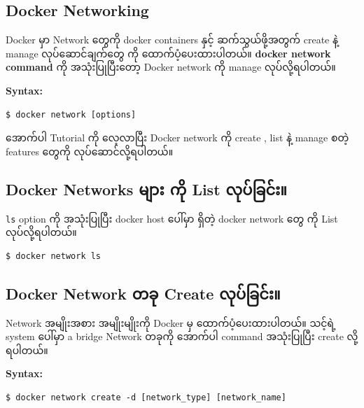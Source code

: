 \hypertarget{docker-networking-1}{%
\subsection{Docker Networking}\label{docker-networking-1}}

Docker မှာ Network တွေကို docker containers နှင့် ဆက်သွယ်ဖို့အတွက်
create နဲ့ manage လုပ်ဆောင်ချက်တွေ ကို ထောက်ပံ့ပေးထားပါတယ်။
\textbf{docker network command} ကို အသုံးပြုပြီးတော့ Docker network ကို
manage လုပ်လို့ရပါတယ်။

\textbf{Syntax:}

\begin{verbatim}
$ docker network [options]
\end{verbatim}

အောက်ပါ Tutorial ကို လေ့လာပြီး Docker network ကို create , list နဲ့
manage စတဲ့ features တွေကို လုပ်ဆောင်လို့ရပါတယ်။

\hypertarget{docker-networks-ux1019ux103bux102cux1038-ux1000ux102dux102f-list-ux101cux102fux1015ux103aux1001ux103cux1004ux103aux1038}{%
\subsection{Docker Networks များ ကို List
လုပ်ခြင်း။}\label{docker-networks-ux1019ux103bux102cux1038-ux1000ux102dux102f-list-ux101cux102fux1015ux103aux1001ux103cux1004ux103aux1038}}

\texttt{ls} option ကို အသုံးပြုပြီး docker host ပေါ်မှာ ရှိတဲ့ docker
network တွေ ကို List လုပ်လို့ရပါတယ်။

\begin{verbatim}
$ docker network ls
\end{verbatim}

\hypertarget{docker-network-ux1010ux1001ux102f-create-ux101cux102fux1015ux103aux1001ux103cux1004ux103aux1038}{%
\subsection{Docker Network တခု Create
လုပ်ခြင်း။}\label{docker-network-ux1010ux1001ux102f-create-ux101cux102fux1015ux103aux1001ux103cux1004ux103aux1038}}

Network အမျိုးအစား အမျိုးမျိုးကို Docker မှ ထောက်ပံ့ပေးထားပါတယ်။ သင့်ရဲ့
system ပေါ်မှာ a bridge Network တခုကို အောက်ပါ command အသုံးပြုပြီး
create လို့ရပါတယ်။

\textbf{Syntax:}

\begin{verbatim}
$ docker network create -d [network_type] [network_name]
\end{verbatim}


